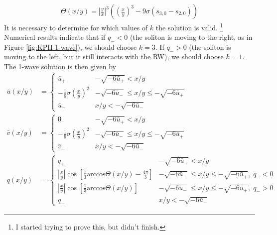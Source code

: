 \documentclass[12pt]{article}
\numberwithin{equation}{section}
\begin{document}
\begin{align}
    \Theta(x/y) = \left|\frac{y}{x}\right|^3\left(\left(\frac{x}{y}\right)^3 - 9\sigma(s_{3,0}-s_{2,0})\right)
\end{align}
It is necessary to determine for which values of $k$ the solution is valid. \footnote{I started trying to prove this, but didn't finish.} Numerical results indicate that if $q_- <0$ (the soliton is moving to the right, as in Figure \ref{fig:KPII 1-wave}), we should choose $k=3$. If $q_- >0$ (the soliton is moving to the left, but it still interacts with the RW), we should choose $k = 1$. The 1-wave solution is then given by 
\begin{subequations}
    \begin{align}
        \bar u(x/y) &= \left\{\begin{array}{ll}
             \bar u_+ &   -\sqrt{-6\bar u_+} < x/y\\
             -\frac{1}{6}\sigma\left(\frac{x}{y}\right)^2 & -\sqrt{-6\bar u_-} \leq x/y \leq -\sqrt{-6\bar u_+} \\
             \bar u_- & x/y < -\sqrt{-6\bar u_-}
        \end{array}\right. \\
        \bar v(x/y) &= \left\{\begin{array}{ll}
              0 &   -\sqrt{-6\bar u_+} < x/y\\
             -\frac{1}{6}\sigma\left(\frac{x}{y}\right)^2 & -\sqrt{-6\bar u_-} \leq x/y \leq -\sqrt{-6\bar u_+} \\
             \bar v_- & x/y < -\sqrt{-6\bar u_-}
        \end{array}\right. \\
        q(x/y) &= \left\{\begin{array}{ll}
              q_+ &   -\sqrt{-6\bar u_+} < x/y\\
             \left|\frac{x}{y}\right|\cos\left[\frac{1}{3}\mathrm{arccos}\Theta(x/y) - \frac{4\pi}{3}\right] & -\sqrt{-6\bar u_-} \leq x/y \leq -\sqrt{-6\bar u_+}, \; q_- <0 \\
             \left|\frac{x}{y}\right|\cos\left[\frac{1}{3}\mathrm{arccos}\Theta(x/y)\right] & -\sqrt{-6\bar u_-} \leq x/y \leq -\sqrt{-6\bar u_+}, \; q_->0 \\
             q_- & x/y < -\sqrt{-6\bar u_-}
        \end{array}\right. 
    \end{align} \label{exact u,v,q}
\end{subequations}
\end{document}
